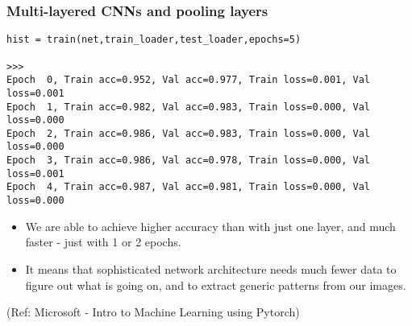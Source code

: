 \begin{frame}[fragile] \frametitle{Multi-layered CNNs and pooling layers}

\begin{lstlisting}
hist = train(net,train_loader,test_loader,epochs=5)

>>>
Epoch  0, Train acc=0.952, Val acc=0.977, Train loss=0.001, Val loss=0.001
Epoch  1, Train acc=0.982, Val acc=0.983, Train loss=0.000, Val loss=0.000
Epoch  2, Train acc=0.986, Val acc=0.983, Train loss=0.000, Val loss=0.000
Epoch  3, Train acc=0.986, Val acc=0.978, Train loss=0.000, Val loss=0.001
Epoch  4, Train acc=0.987, Val acc=0.981, Train loss=0.000, Val loss=0.000
\end{lstlisting}

\begin{itemize}

\item We are able to achieve higher accuracy than with just one layer, and much faster - just with 1 or 2 epochs. 
\item It means that sophisticated network architecture needs much fewer data to figure out what is going on, and to extract generic patterns from our images.
\end{itemize}


\tiny{(Ref: Microsoft - Intro to Machine Learning using Pytorch)}
\end{frame}







